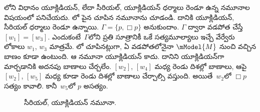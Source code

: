 \documentclass[../../../include/open-logic-section]{subfiles}
\begin{document}


లోని విధానం యూక్లిడియన్, లేదా
సీరియల్, యూక్లిడియన్ ధర్మాలు రెండూ ఉన్న నమూనాల విషయంలో పనిచేయదు.
లో పైన చూపిన నమూనాను చూడండి.
దానికి యూక్లిడియన్, సీరియల్ ధర్మాలు రెండూ ఉన్నాయి. $\Gamma =
\{p, \Box p \}$ అనుకుందాం. $\Gamma$ ద్వారా వడపోత
చేస్తే $[w_1] = [w_3]$. ఎందుకంటే~$\Gamma$లోని ప్రతి సూత్రానికీ
ఒకే సత్యమూల్యాలు ఇచ్చే వేర్వేరు లోకాలు $w_1$, $w_3$ మాత్రమే.
లో చూపినట్లుగా, ఏ వడపోతలోనైనా
$\mModel{M}$ నుంచి వచ్చిన బాణం కూడా ఉంటుంది.
ఆ నమూనా యూక్లిడియన్ కాదు. దానిని యూక్లిడియన్‌గా
మార్చడానికి అదనపు బాణాలు చేర్చలేం. $[w_2]$,
$[w_4]$ మధ్య రెండు దిశల్లో బాణాలు, ఆపై $[w_2]$,
$[w_5]$ మధ్య కూడా రెండు దిశల్లో బాణాలు చేర్చాల్సి
వస్తుంది. అయితే~$w_2$లో $\Box
p$ సత్యం కావాలి. కానీ~$w_5$లో $p$ అసత్యం.

\begin{figure}[htpb]
  \centering
  \caption{సీరియల్, యూక్లిడియన్ నమూనా.}
\end{figure}
\end{document}
